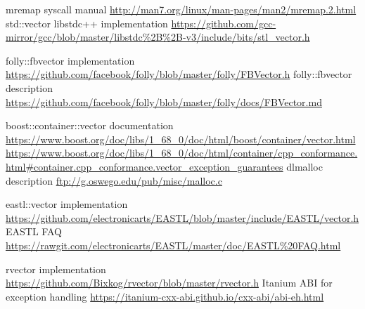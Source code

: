 \documentclass[inz, english, shortabstract]{iithesis}
\begin{document}
\begin{thebibliography}{1}
 mremap syscall manual \url{http://man7.org/linux/man-pages/man2/mremap.2.html}
 std::vector libstdc++ implementation \url{https://github.com/gcc-mirror/gcc/blob/master/libstdc%2B%2B-v3/include/bits/stl_vector.h}

 folly::fbvector implementation \url{https://github.com/facebook/folly/blob/master/folly/FBVector.h}
 folly::fbvector description \url{https://github.com/facebook/folly/blob/master/folly/docs/FBVector.md}

 boost::container::vector documentation \url{https://www.boost.org/doc/libs/1_68_0/doc/html/boost/container/vector.html}
 \url{https://www.boost.org/doc/libs/1_68_0/doc/html/container/cpp_conformance.html#container.cpp_conformance.vector_exception_guarantees}
 dlmalloc description \url{ftp://g.oswego.edu/pub/misc/malloc.c}

 eastl::vector implementation \url{https://github.com/electronicarts/EASTL/blob/master/include/EASTL/vector.h}
 EASTL FAQ \url{https://rawgit.com/electronicarts/EASTL/master/doc/EASTL%20FAQ.html}

 rvector implementation \url{https://github.com/Bixkog/rvector/blob/master/rvector.h}
 Itanium ABI for exception handling \url{https://itanium-cxx-abi.github.io/cxx-abi/abi-eh.html}
\end{thebibliography}

\lstlistoflistings
\end{document}
